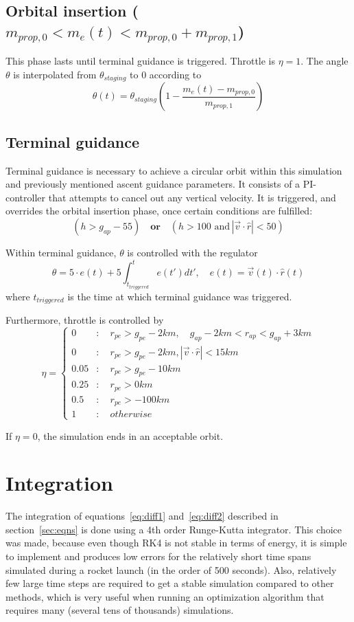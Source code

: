 \documentclass[11pt]{article}
\begin{document}
\subsection{Orbital insertion ($m_{prop,0} < m_e(t) < m_{prop,0} + m_{prop,1}$)}
This phase lasts until terminal guidance is triggered. Throttle is $\eta = 1$. The angle $\theta$ is interpolated from $\theta_{staging}$ to 0 according to
$$
\theta(t) = \theta_{staging} \left( 1 - \frac{m_e(t) - m_{prop,0}}{m_{prop,1}} \right)
$$

\subsection{Terminal guidance}
Terminal guidance is necessary to achieve a circular orbit within this simulation and previously mentioned ascent guidance parameters.
It consists of a PI-controller that attempts to cancel out any vertical velocity.
It is triggered, and overrides the orbital insertion phase, once certain conditions are fulfilled:
$$
\left( h > g_{ap} - 55  \right) \quad \textbf{or} \quad \left(  h > 100 \,\, \text{and} \, \left| \vec{v} \cdot \hat{r} \right| < 50 \right)
$$

Within terminal guidance, $\theta$ is controlled with the regulator 
$$
\theta = 5 \cdot e(t) + 5 \int_{t_{triggered}}^t e(t') dt',
\quad
e(t) = \vec{v}(t) \cdot \hat{r}(t)
$$
where $t_{triggered}$ is the time at which terminal guidance was triggered.

Furthermore, throttle is controlled by
$$
\eta = \begin{cases}
0 & : \quad r_{pe} > g_{pe} - 2 km, \quad g_{ap} - 2 km < r_{ap} < g_{ap} + 3 km \\
0 & : \quad r_{pe} > g_{pe} - 2 km, \left| \vec{v} \cdot \hat{r} \right| < 15 km \\
0.05 & : \quad r_{pe} > g_{pe} - 10 km \\
0.25 & : \quad r_{pe} > 0 km \\
0.5 & : \quad r_{pe} > -100 km \\
1 & :  \quad otherwise
\end{cases}
$$

If $\eta = 0$, the simulation ends in an acceptable orbit.

\section{Integration}
The integration of equations~\eqref{eq:diff1} and~\eqref{eq:diff2} described in section~\ref{sec:eqns} is done using a 4th order Runge-Kutta integrator.
This choice was made, because even though RK4 is not stable in terms of energy, it is simple to implement and produces low errors for the relatively short time spans 
simulated during a rocket launch (in the order of 500 seconds).
Also, relatively few large time steps are required to get a stable simulation compared to other methods, which is very useful when running an optimization algorithm that requires many (several tens of thousands) simulations.
\end{document}
